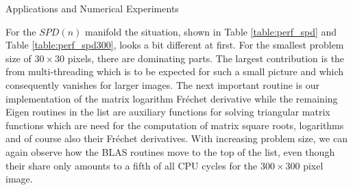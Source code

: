\begin{chapter}{Applications and Numerical Experiments}
\begin{table}[h!]
\centering
\footnotesize
\setlength{\tabcolsep}{3pt}
\caption[]{Share of total CPU cycles for IRLS minimization over $M=\mathbb{R}^3$
"Lena.jpg", $361\times 361$ pixel
"Mathematicians.jpg", $1280\times 1024$ pixel
\label{table:perf_euc}
}
\end{table}

For the $SPD(n)$ manifold the situation, shown in Table \ref{table:perf_spd} and Table \ref{table:perf_spd300}, looks a bit different at first. 
For the smallest problem size of $30\times 30$ pixels, there are dominating parts. The largest contribution is the from multi-threading which is to be expected
for such a small picture and which consequently vanishes for larger images. 
The next important routine is our implementation of the matrix logarithm Fr\'{e}chet derivative while the remaining Eigen routines in the
list are auxiliary functions for solving triangular matrix functions which are need for the computation of matrix square roots, logarithms and of course also their
Fr\'{e}chet derivatives. With increasing problem size, we can again observe how the BLAS routines move to the top of the list, even though their share only amounts 
to a fifth of all CPU cycles for the $300\times 300$ pixel image. \\


\end{chapter}
